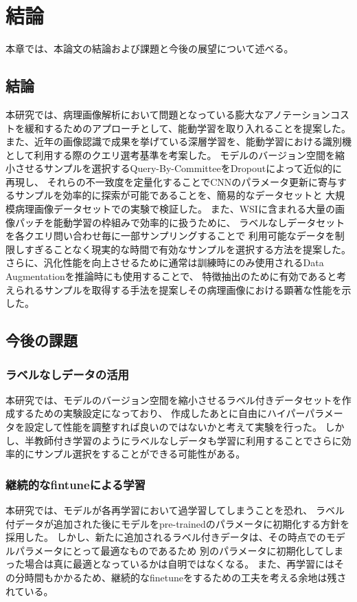 \chapter{結論}
本章では、本論文の結論および課題と今後の展望について述べる。

\section{結論}
本研究では、病理画像解析において問題となっている膨大なアノテーションコストを緩和するためのアプローチとして、能動学習を取り入れることを提案した。
また、近年の画像認識で成果を挙げている深層学習を、能動学習における識別機として利用する際のクエリ選考基準を考案した。
モデルのバージョン空間を縮小させるサンプルを選択するQuery-By-CommitteeをDropoutによって近似的に再現し、
それらの不一致度を定量化することでCNNのパラメータ更新に寄与するサンプルを効率的に探索が可能であることを、簡易的なデータセットと
大規模病理画像データセットでの実験で検証した。
また、WSIに含まれる大量の画像パッチを能動学習の枠組みで効率的に扱うために、
ラベルなしデータセットを各クエリ問い合わせ毎に一部サンプリングすることで
利用可能なデータを制限しすぎることなく現実的な時間で有効なサンプルを選択する方法を提案した。
さらに、汎化性能を向上させるために通常は訓練時にのみ使用されるData Augmentationを推論時にも使用することで、
特徴抽出のために有効であると考えられるサンプルを取得する手法を提案しその病理画像における顕著な性能を示した。


\section{今後の課題}

\subsection{ラベルなしデータの活用}
本研究では、モデルのバージョン空間を縮小させるラベル付きデータセットを作成するための実験設定になっており、
作成したあとに自由にハイパーパラメータを設定して性能を調整すれば良いのではないかと考えて実験を行った。
しかし、半教師付き学習のようにラベルなしデータも学習に利用することでさらに効率的にサンプル選択をすることができる可能性がある。

\subsection{継続的なfintuneによる学習}
本研究では、モデルが各再学習において過学習してしまうことを恐れ、
ラベル付データが追加された後にモデルをpre-trainedのパラメータに初期化する方針を採用した。
しかし、新たに追加されるラベル付きデータは、その時点でのモデルパラメータにとって最適なものであるため
別のパラメータに初期化してしまった場合は真に最適となっているかは自明ではなくなる。
また、再学習にはその分時間もかかるため、継続的なfinetuneをするための工夫を考える余地は残されている。
